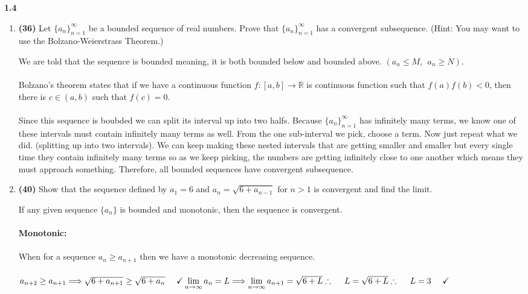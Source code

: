 \documentclass[fleqn]{article}
\begin{document}
  \textbf{1.4}
  \begin{enumerate}
    \item \textbf{(36)} Let $\{a_n\}_{n=1}^{\infty}$ be a bounded sequence of real numbers. Prove that
    $\{a_n\}_{n=1}^{\infty}$ has a convergent subsequence. (Hint: You may want to use the Bolzano-Weierstrass Theorem.)

    \textcolor{hwColor}{
       We are told that the sequence is bounded meaning, it is both bounded below and bounded above. $(a_n \leq M, ~~ a_n\geq N)$. 
       \\
       \\
       Bolzano's theorem states that if we have a continuous function $f: [a,b] \longrightarrow \mathbb{R}$ is continuous function
       such that $f(a)f(b)<0$, then there is $c \in (a,b)$ such that $f(c)=0$.  
       \\
       \\
       Since this sequence is boubded we can split its interval up into two halfs. Because $\{a_n\}_{n=1}^{\infty}$ has
       infinitely many terms, we know one of these intervals must contain infinitely many terms as well. From the one sub-interval
       we pick, choose a term. Now just repeat what we did. (splitting up into two intervals).
       We can keep making these nested intervals that are getting smaller and smaller but every single time 
       they contain infinitely many terms so as we keep picking, the numbers are getting infinitely close to one another
       which means they must approach something. Therefore, all bounded sequences have convergent subsequence.
    }

    \item \textbf{(40)} Show that the sequence defined by $a_1=6$ and $a_n=\sqrt{6+a_{n-1}}$ for $n > 1$ is convergent and find the limit.
  
      \textcolor{hwColor}{
        If any given sequence $\{a_n\}$ is bounded and monotonic, then the sequence is convergent.
        \\
        \\
        \textbf{Monotonic:}
        \\
        \\
        When for a sequence $a_n \geq a_{n+1}$ then we have a monotonic decreasing sequence.
        \\
        \\
        $
          a_{n+2} \geq a_{n+1} \Longrightarrow \sqrt{6+a_{n+1}} \geq \sqrt{6+a_n} ~~~~ \checkmark
          \\
          \\
          \\
          \lim\limits_{n \to \infty} a_n=L \Longrightarrow \lim\limits_{n \to \infty} a_{n+1}=\sqrt{6+L}
          \\
          \\
          \\
          \therefore ~~~~ L=\sqrt{6+L} 
          \\
          \\
          \\
          \therefore ~~~~ L=3 ~~~~ \checkmark
        $
      }
  \end{enumerate}
\end{document}
